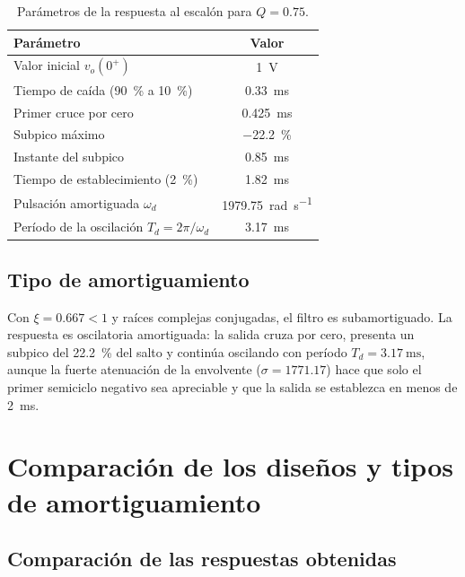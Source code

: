 \begin{table}[H]
  \centering
  \begin{tabular}{|l|c|}
    \hline
    Parámetro & Valor \\
    \hline
    Valor inicial $v_o(0^+)$                                  & \qty{1}{\volt} \\
    Tiempo de caída (\qty{90}{\percent} a \qty{10}{\percent}) & \qty{0.33}{\milli\second} \\
    Primer cruce por cero                                     & \qty{0.425}{\milli\second} \\
    Subpico máximo                                            & \qty{-22.2}{\percent} \\
    Instante del subpico                                      & \qty{0.85}{\milli\second} \\
    Tiempo de establecimiento (\qty{2}{\percent})             & \qty{1.82}{\milli\second} \\
    Pulsación amortiguada $\omega_d$                          & \qty{1979.75}{\radian\per\second} \\
    Período de la oscilación $T_d = 2\pi/\omega_d$            & \qty{3.17}{\milli\second} \\
    \hline
  \end{tabular}
  \caption{Parámetros de la respuesta al escalón para $Q = \num{0.75}$.}
  \label{tab:parametros-q075}
\end{table}

\subsection{Tipo de amortiguamiento}

Con $\xi = \num{0.667} < 1$ y raíces complejas conjugadas, el filtro es subamortiguado. La respuesta es
oscilatoria amortiguada: la salida cruza por cero, presenta un subpico del \qty{22.2}{\percent} del salto
y continúa oscilando con período $T_d = \qty{3.17}{\milli\second}$, aunque la fuerte atenuación de la
envolvente ($\sigma = \num{1771.17}$) hace que solo el primer semiciclo negativo sea apreciable y que la
salida se establezca en menos de \qty{2}{\milli\second}.

\section{Comparación de los diseños y tipos de amortiguamiento}

\subsection{Comparación de las respuestas obtenidas}

